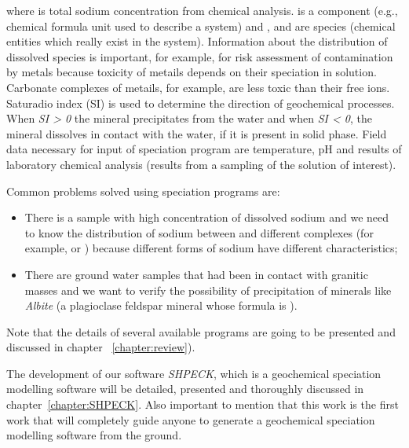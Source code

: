 \documentclass[ppgc,mestrado,english]{iiufrgs}
\begin{document}
where  is total sodium concentration from chemical analysis.  is a component (e.g., chemical formula unit used to describe a system) and ,  and  are species (chemical entities which really exist in the system). Information about the distribution of dissolved species is important, for example, for risk assessment of contamination by metals because toxicity of metails depends on their speciation in solution. Carbonate complexes of metails, for example, are less toxic than their free ions.
Saturadio index (SI) is used to determine the direction of geochemical processes. When \emph{SI > 0} the mineral precipitates from the water and when \emph{SI < 0}, the mineral dissolves in contact with the water, if it is present in solid phase. Field data necessary for input of speciation program are temperature, pH and results of laboratory chemical analysis (results from a sampling of the solution of interest).

Common problems solved using speciation programs are: 
\begin{itemize}
\item There is a sample with high concentration of dissolved sodium and we need to know the distribution of sodium between  and different complexes (for example,  or ) because different forms of sodium have different characteristics;
\item There are ground water samples that had been in contact with granitic masses and we want to verify the possibility of precipitation of minerals like \emph{Albite} (a plagioclase feldspar mineral whose formula is \emph{}).
\end{itemize}
Note that the details of several available programs are going to be presented and discussed in chapter ~\ref{chapter:review}).

The development of our software \emph{SHPECK}, which is a geochemical speciation modelling software will be detailed, presented and thoroughly discussed in chapter~\ref{chapter:SHPECK}. Also important to mention that this work is the first work that will completely guide anyone to generate a geochemical speciation modelling software from the ground.

\end{document}
